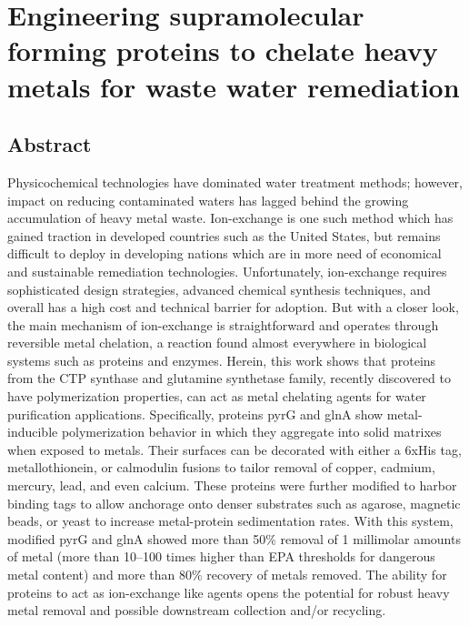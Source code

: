 \documentclass[../main/main]{subfiles}
\begin{document}
\chapter{Engineering supramolecular forming proteins to chelate heavy metals for waste water remediation}
\label{chapter4}
\renewcommand{\figurename}{Figure}

\section*{Abstract}
Physicochemical technologies have dominated water treatment methods; however, impact on reducing contaminated waters has lagged behind the growing accumulation of heavy metal waste. Ion-exchange is one such method which has gained traction in developed countries such as the United States, but remains difficult to deploy in developing nations which are in more need of economical and sustainable remediation technologies. Unfortunately, ion-exchange requires sophisticated design strategies, advanced chemical synthesis techniques, and overall has a high cost and technical barrier for adoption. But with a closer look, the main mechanism of ion-exchange is straightforward and operates through reversible metal chelation, a reaction found almost everywhere in biological systems such as proteins and enzymes. Herein, this work shows that proteins from the CTP synthase and glutamine synthetase family, recently discovered to have polymerization properties, can act as metal chelating agents for water purification applications. Specifically, proteins pyrG and glnA show metal-inducible polymerization behavior in which they aggregate into solid matrixes when exposed to metals. Their surfaces can be decorated with either a 6xHis tag, metallothionein, or calmodulin fusions to tailor removal of copper, cadmium, mercury, lead, and even calcium. These proteins were further modified to harbor binding tags to allow anchorage onto denser substrates such as agarose, magnetic beads, or yeast to increase metal-protein sedimentation rates. With this system, modified pyrG and glnA showed more than 50\% removal of 1 millimolar amounts of metal (more than 10--100 times higher than EPA thresholds for dangerous metal content) and more than 80\% recovery of metals removed. The ability for proteins to act as ion-exchange like agents opens the potential for robust heavy metal removal and possible downstream collection and/or recycling.
\end{document}
